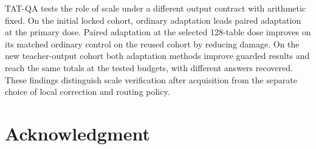 \documentclass[10pt,letterpaper,conference]{IEEEtran}
\begin{document}
TAT-QA tests the role of scale under a different output contract with arithmetic fixed. On the initial locked cohort, ordinary adaptation leads paired adaptation at the primary dose. Paired adaptation at the selected 128-table dose improves on its matched ordinary control on the reused cohort by reducing damage. On the new teacher-output cohort both adaptation methods improve guarded results and reach the same totals at the tested budgets, with different answers recovered. These findings distinguish scale verification after acquisition from the separate choice of local correction and routing policy.

\section*{Acknowledgment}
\end{document}
